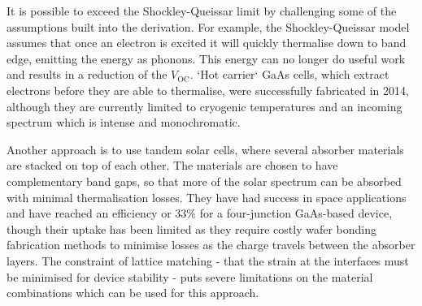 
It is possible to exceed the Shockley-Queissar limit by challenging some of the assumptions built into the derivation. For example, the Shockley-Queissar model assumes that once an electron is excited it will quickly thermalise down to band edge, emitting the energy as phonons. This energy can no longer do useful work and results in a reduction of the $V_{\text{OC}}$. `Hot carrier` GaAs cells, which extract electrons before they are able to thermalise, were successfully fabricated in 2014, although they are currently limited to cryogenic temperatures and an incoming spectrum which is intense and monochromatic. 

Another approach is to use tandem solar cells, where several absorber materials are stacked on top of each other. The materials are chosen to have complementary band gaps, so that more of the solar spectrum can be absorbed with minimal thermalisation losses. They have had success in space applications and have reached an efficiency or 33\% for a four-junction GaAs-based device, though their uptake has been limited as they require costly wafer bonding fabrication methods to minimise losses as the charge travels between the absorber layers. The constraint of lattice matching - that the strain at the interfaces must be minimised for device stability - puts severe limitations on the material combinations which can be used for this approach. 




